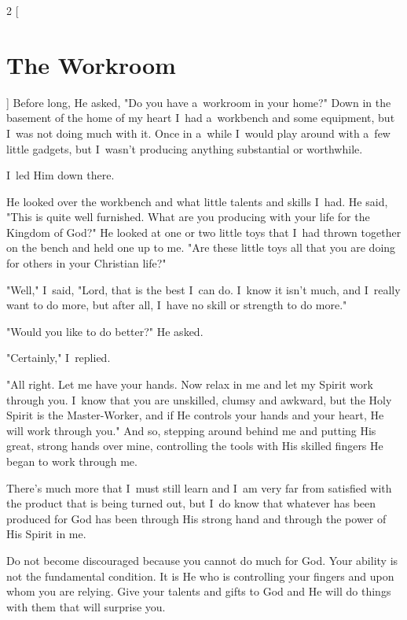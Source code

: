 \documentclass[a4paper,12pt]{article}
\begin{document}
\begin{multicols}{2}
    [
\section*{The Workroom}
    ]
Before long, He asked, "Do you have a~workroom in your home?" Down in the basement of the home of my heart I~had a~workbench and some equipment, but I~was not doing much with it. Once in a~while I~would play around with a~few little gadgets, but I~wasn't producing anything substantial or worthwhile. 

I~led Him down there. 

He looked over the workbench and what little talents and skills I~had. He said, "This is quite well furnished. What are you producing with your life for the Kingdom of God?" He looked at one or two little toys that I~had thrown together on the bench and held one up to me. "Are these little toys 
all that you are doing for others in your Christian life?" 

"Well," I~said, "Lord, that is the best I~can do. I~know it isn't much, and I~really want to do more, but after all, I~have no skill or strength to do more." 

"Would you like to do better?" He asked. 

"Certainly," I~replied. 

"All right. Let me have your hands. Now relax in me and let my Spirit work through you. I~know that you are unskilled, clumsy and awkward, but the Holy Spirit is the Master-Worker, and if He controls your hands and your heart, He will work through you." And so, stepping around behind me and putting His great, strong hands over mine, controlling the tools with His skilled fingers He began to work through me. 

There's much more that I~must still learn and I~am very far from satisfied with the product that is being turned out, but I~do know that whatever has been produced for God has been through His strong hand and through the power of His Spirit in me. 

Do not become discouraged because you cannot do much for God. Your ability is not the fundamental condition. It is He who is controlling your fingers and upon whom you are relying. Give your talents and gifts to God and He will do things with them that will surprise you.
\end{multicols}
\end{document}
